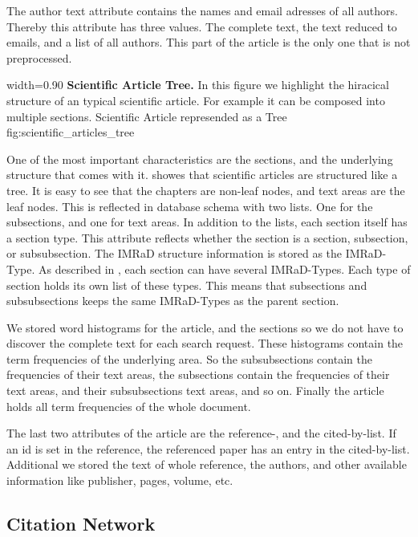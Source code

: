 The author text attribute contains the names and email adresses of all authors. Thereby this attribute has three values. The complete text, the text reduced to emails, and a list of all authors. This part of the article is the only one that is not preprocessed.

      {width=0.90\textwidth}
      {\textbf{Scientific Article Tree.} In this figure we highlight the hiracical structure of an typical scientific article. For example it can be composed into multiple sections.}
      {Scientific Article represended as a Tree}
      {fig:scientific_articles_tree}

One of the most important characteristics are the sections, and the underlying structure that comes with it.  showes that scientific articles are structured like a tree. It is easy to see that the chapters are non-leaf nodes, and text areas are the leaf nodes. This is reflected in database schema with two lists. One for the subsections, and one for text areas. In addition to the lists, each section itself has a section type. This attribute reflects whether the section is a section, subsection, or subsubsection. The IMRaD structure information is stored as the IMRaD-Type. As described in , each section can have several IMRaD-Types. Each type of section holds its own list of these types. This means that subsections and subsubsections keeps the same IMRaD-Types as the parent section.

We stored word histograms for the article, and the sections so we do not have to discover the complete text for each search request. These histograms contain the term frequencies of the underlying area. So the subsubsections contain the frequencies of their text areas, the subsections contain the frequencies of their text areas, and their subsubsections text areas, and so on. Finally the article holds all term frequencies of the whole document.

The last two attributes of the article are the reference-, and the cited-by-list. If an id is set in the reference, the referenced paper has an entry in the cited-by-list. Additional we stored the text of whole reference, the authors, and other available information like publisher, pages, volume, etc.

\subsection{Citation Network}
\label{sec:citation_network}

